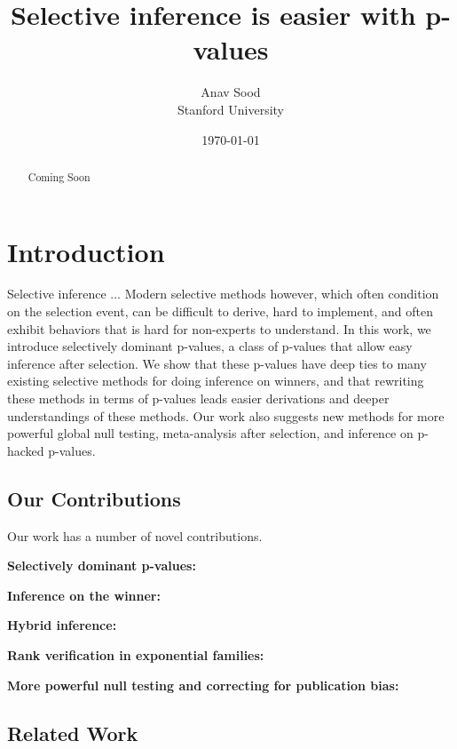 \documentclass{article}
\title{Selective inference is easier with p-values}
\author{Anav Sood\\ Stanford University}
\date{\today}
\begin{document}
\maketitle

\begin{abstract}
Coming Soon
\end{abstract}


\section{Introduction}

Selective inference ... Modern selective methods however, which often condition on the selection event, can be difficult to derive, hard to implement, and often exhibit behaviors that is hard for non-experts to understand. In this work, we introduce selectively dominant p-values, a class of p-values that allow easy inference after selection. We show that these p-values have deep ties to many existing selective methods for doing inference on winners, and that rewriting these methods in terms of p-values leads easier derivations and deeper understandings of these methods. Our work also suggests new methods for more powerful global null testing, meta-analysis after selection, and inference on p-hacked p-values. 

\subsection{Our Contributions}

Our work has a number of novel contributions. \newline 

\noindent \textbf{Selectively dominant p-values: } \newline 

\noindent \textbf{Inference on the winner: }\newline 

\noindent \textbf{Hybrid inference: }\newline 

\noindent \textbf{Rank verification in exponential families: }\newline 

\noindent \textbf{More powerful null testing and correcting for publication bias: }

\subsection{Related Work}
\end{document}
